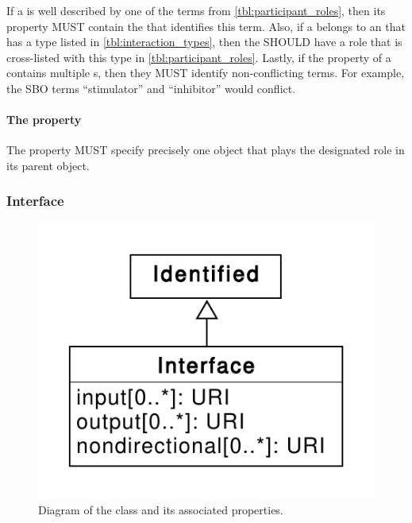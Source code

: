 If a  is well described by one of the terms from \ref{tbl:participant_roles}, then its  property MUST contain the  that identifies this term.
Also, if a  belongs to an  that has a type listed in \ref{tbl:interaction_types}, then the  SHOULD have a role that is cross-listed with this type in \ref{tbl:participant_roles}.
Lastly, if the  property of a  contains multiple
 s, then they MUST identify non-conflicting terms. For example, the SBO terms ``stimulator'' and ``inhibitor'' would conflict.


\paragraph{The  property}\label{sec:participant}

The  property MUST specify precisely one  object that plays the designated role in its parent  object.

\subsubsection{Interface}
\label{sec:Interface}

\begin{figure}[ht]
\begin{center}
\includegraphics[scale=0.6]{uml/interface}
\caption[]{Diagram of the  class and its associated properties.}
\label{uml:interface}
\end{center}
\end{figure}

